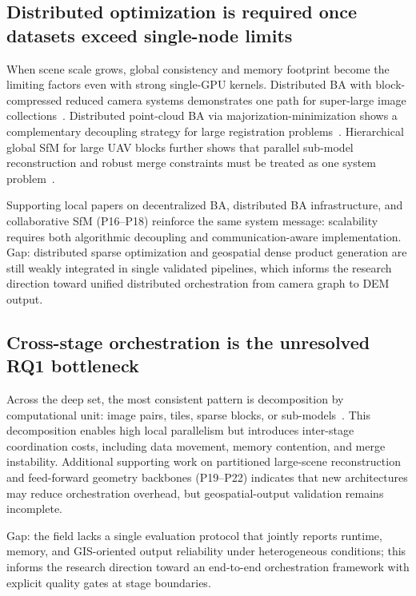 \subsection{Distributed optimization is required once datasets exceed single-node limits}

When scene scale grows, global consistency and memory footprint become the limiting factors even with strong single-GPU kernels. Distributed BA with block-compressed reduced camera systems demonstrates one path for super-large image collections~\cite{Zheng2023}. Distributed point-cloud BA via majorization-minimization shows a complementary decoupling strategy for large registration problems~\cite{Li2025BALM}. Hierarchical global SfM for large UAV blocks further shows that parallel sub-model reconstruction and robust merge constraints must be treated as one system problem~\cite{Zhou2026}.

Supporting local papers on decentralized BA, distributed BA infrastructure, and collaborative SfM (P16--P18) reinforce the same system message: scalability requires both algorithmic decoupling and communication-aware implementation. Gap: distributed sparse optimization and geospatial dense product generation are still weakly integrated in single validated pipelines, which informs the research direction toward unified distributed orchestration from camera graph to DEM output.

\subsection{Cross-stage orchestration is the unresolved RQ1 bottleneck}

Across the deep set, the most consistent pattern is decomposition by computational unit: image pairs, tiles, sparse blocks, or sub-models~\cite{Li2025FastMap,deFranchis2014,Zhou2026,Zheng2023}. This decomposition enables high local parallelism but introduces inter-stage coordination costs, including data movement, memory contention, and merge instability. Additional supporting work on partitioned large-scene reconstruction and feed-forward geometry backbones (P19--P22) indicates that new architectures may reduce orchestration overhead, but geospatial-output validation remains incomplete.

Gap: the field lacks a single evaluation protocol that jointly reports runtime, memory, and GIS-oriented output reliability under heterogeneous conditions; this informs the research direction toward an end-to-end orchestration framework with explicit quality gates at stage boundaries.

